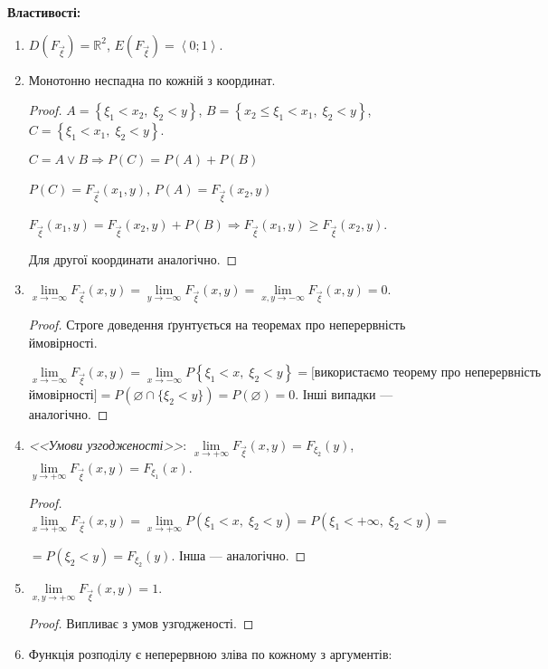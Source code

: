 \noindent\textbf{Властивості: }
\begin{enumerate}
    \item $D(F_{\vec{\xi}}) = \mathbb{R}^2$, $E(F_{\vec{\xi}}) = 
    \left<0; 1\right>$.
    \item Монотонно неспадна по кожній з координат.
    \begin{proof}
        $A = \left\{\xi_1 < x_2,\;\xi_2 < y \right\}$, 
        $B = \left\{x_2 \leq \xi_1 < x_1,\; \xi_2<y\right\}$, 
        $C = \left\{\xi_1 < x_1,\; \xi_2 < y\right\}$.

        $C = A \vee B \Rightarrow P(C) = P(A) + P(B)$
    
        $P(C) = F_{\vec{\xi}}(x_1, y)$,  
        $P(A) = F_{\vec{\xi}}(x_2, y)$

        $F_{\vec{\xi}}(x_1, y) = F_{\vec{\xi}}(x_2, y) + P(B)
        \Rightarrow F_{\vec{\xi}}(x_1, y) \geq  F_{\vec{\xi}}(x_2, y)$. 
        
        Для другої координати аналогічно.
    \end{proof}
    \item $\lim\limits_{x \to -\infty} F_{\vec{\xi}}(x, y) = 
           \lim\limits_{y \to -\infty} F_{\vec{\xi}}(x, y) = 
           \lim\limits_{x,y \to -\infty} F_{\vec{\xi}}(x, y) = 0$.
    \begin{proof}
        Строге доведення ґрунтується на теоремах про неперервність 
        ймовірності.

        $\lim\limits_{x \to -\infty} F_{\vec{\xi}}(x, y) = 
        \lim\limits_{x \to -\infty} P\left\{\xi_1<x,\;\xi_2<y\right\} 
        = [\text{використаємо теорему про неперервність}$ 
        $\text{ймовірності}] = P(\varnothing \cap \{\xi_2 < y\})
        = P(\varnothing) = 0$.
        Інші випадки --- аналогічно.
    \end{proof}
    \item \emph{<<Умови узгодженості>>}:
    $\lim\limits_{x \to +\infty} F_{\vec{\xi}}(x, y) = F_{\xi_2}(y)$, 
    $\lim\limits_{y \to +\infty} F_{\vec{\xi}}(x, y) = F_{\xi_1}(x)$.
    \begin{proof}
        $\lim\limits_{x \to +\infty} F_{\vec{\xi}}(x, y) = 
        \lim\limits_{x \to +\infty} 
        P\left(\xi_1 < x,\; \xi_2 < y\right) = 
        P\left(\xi_1 < +\infty,\;\xi_2<y\right) = $
        
        $= P\left(\xi_2<y\right) = F_{\xi_2}(y)$. Інша --- аналогічно.
    \end{proof}
    \item $\lim\limits_{x,y \to +\infty} F_{\vec{\xi}}(x, y) = 1$.
    \begin{proof}
        Випливає з умов узгодженості.
    \end{proof}
    \item Функція розподілу є неперервною зліва по кожному з аргументів: 
    

\end{enumerate}
